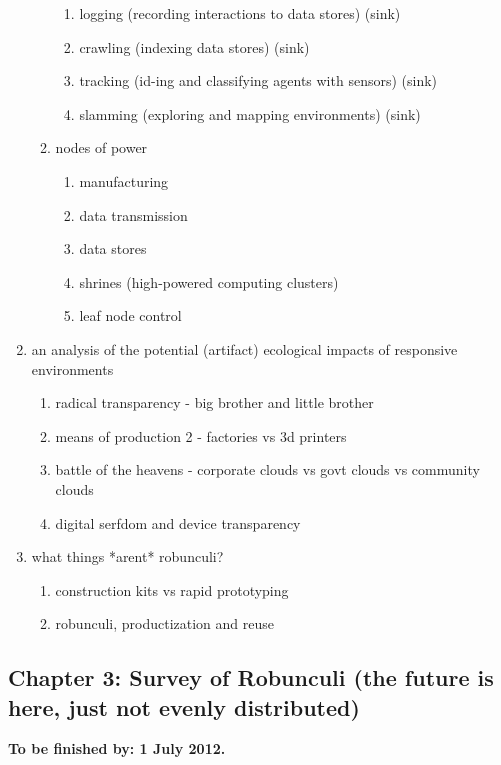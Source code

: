 \documentclass[12pt,letterpaper,notitlepage,onecolumn]{article}
\begin{document}
\begin{enumerate}
\begin{enumerate}
\begin{enumerate}
            \item logging (recording interactions to data stores) (sink)
            \item crawling (indexing data stores) (sink)
            \item tracking (id-ing and classifying agents with sensors) (sink)
            \item slamming (exploring and mapping environments) (sink)
        \end{enumerate}
        \item nodes of power
        \begin{enumerate}
            \item manufacturing
            \item data transmission
            \item data stores
            \item shrines (high-powered computing clusters)
            \item leaf node control
        \end{enumerate}        
    \end{enumerate}
    \item an analysis of the potential (artifact) ecological impacts of responsive environments
    \begin{enumerate}
        \item radical transparency - big brother and little brother
        \item means of production 2 - factories vs 3d printers
        \item battle of the heavens - corporate clouds vs govt clouds vs community clouds
        \item digital serfdom and device transparency
    \end{enumerate}
    \item what things *arent* robunculi?
    \begin{enumerate}
        \item construction kits vs rapid prototyping
        \item robunculi, productization and reuse
    \end{enumerate}
\end{enumerate}


\subsection{Chapter 3: Survey of Robunculi (the future is here, just not evenly distributed)}
%
\textbf{To be finished by: 1 July 2012.}
\end{document}
